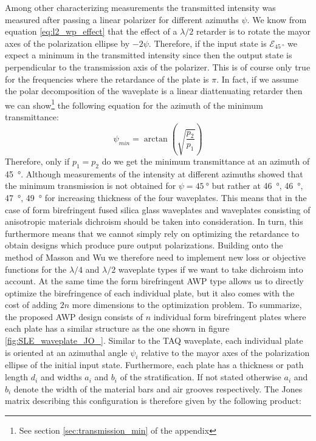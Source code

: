 Among other characterizing measurements the transmitted intensity was measured after passing a linear polarizer for different azimuths $\psi$. We know from equation \ref{eq:l2_wp_effect} that the effect of a $\lambda/2$ retarder is to rotate the mayor axes of the polarization ellipse by $-2\psi$. Therefore, if the input state is $\bm{\mathcal{E}}_{\SI{45}{\degree}}$ we expect a minimum in the transmitted intensity since then the output state is perpendicular to the transmission axis of the polarizer. This is of course only true for the frequencies where the retardance of the plate is $\pi$. In fact, if we assume the polar decomposition of the waveplate is a linear diattenuating retarder then we can show\footnote{See section \ref{sec:transmission_min} of the appendix} the following equation for the azimuth of the minimum transmittance:  
\begin{equation}
    \psi_{min}=\arctan\left(\sqrt{\frac{p_2}{p_1}}\right)
\end{equation}
Therefore, only if $p_1=p_2$ do we get the minimum transmittance at an azimuth of \SI{45}{\degree}. Although measurements of the intensity at different azimuths showed that the minimum transmission is not obtained for $\psi=\SI{45}{\degree}$ but rather at \SI{46}{\degree}, \SI{46}{\degree}, \SI{47}{\degree}, \SI{49}{\degree} for increasing thickness of the four waveplates. This means that in the case of form birefringent fused silica glass waveplates and waveplates consisting of anisotropic materials dichroism should be taken into consideration. In turn, this furthermore means that we cannot simply rely on optimizing the retardance to obtain designs which produce pure output polarizations. Building onto the method of Masson and Wu we therefore need to implement new loss or objective functions for the $\lambda/4$ and $\lambda/2$ waveplate types if we want to take dichroism into account. At the same time the form birefringent AWP type allows us to directly optimize the birefringence of each individual plate, but it also comes with the cost of adding $2n$ more dimensions to the optimization problem. To summarize, the proposed AWP design consists of $n$ individual form birefringent plates where each plate has a similar structure as the one shown in figure \ref{fig:SLE_waveplate_JO_}. Similar to the TAQ waveplate, each individual plate is oriented at an azimuthal angle $\psi_i$ relative to the mayor axes of the polarization ellipse of the initial input state. Furthermore, each plate has a thickness or path length $d_i$ and widths $a_i$ and $b_i$ of the stratification. If not stated otherwise $a_i$ and $b_i$ denote the width of the material bars and air grooves respectively. The Jones matrix describing this configuration is therefore given by the following product:
